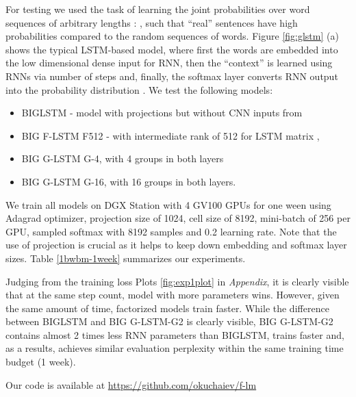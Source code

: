 \documentclass{article} \usepackage{iclr2017_workshop,times}
\begin{document}
For testing we used the task of learning the joint probabilities over word sequences of arbitrary lengths : 
, such that ``real'' sentences have high probabilities compared to the random sequences of words. Figure \ref{fig:glstm} (a) shows the typical LSTM-based model, where first the words are embedded into the low dimensional dense input for RNN, then the ``context'' is learned using RNNs via number of steps and, finally, the softmax layer converts RNN output into the probability distribution .
We test the following models: 
\begin{itemize} 
\item BIGLSTM -  model with projections but without CNN inputs from \citet{jozefowicz2016exploring}
\item BIG F-LSTM F512 - with intermediate rank of 512 for LSTM matrix , \item BIG G-LSTM G-4, with 4 groups in both layers 
\item BIG G-LSTM G-16,  with 16 groups in both layers. 
\end{itemize} 

We train all models on DGX Station with 4 GV100 GPUs for one ween using Adagrad optimizer, projection size of 1024, cell size of 8192, mini-batch of 256 per GPU, sampled softmax with 8192 samples and 0.2 learning rate. Note that the use of projection is crucial as it helps to keep down embedding and softmax layer sizes. Table \ref{1bwbm-1week} summarizes our experiments. 

 
Judging from the training loss Plots  \ref{fig:exp1plot} in \textit{Appendix}, it is clearly visible that at the same step count, model with more parameters wins. However, given the same amount of time, factorized models train faster. While the difference between BIGLSTM and BIG G-LSTM-G2 is clearly visible, BIG G-LSTM-G2 contains almost 2 times less RNN parameters than BIGLSTM, trains faster and, as a results, achieves similar evaluation perplexity within the same training time budget (1 week). 


Our code is available at \url{https://github.com/okuchaiev/f-lm} 
\end{document}
